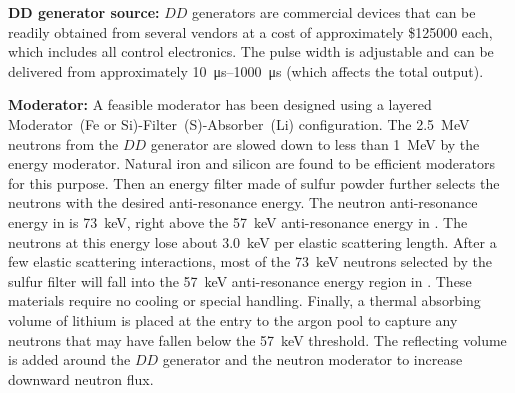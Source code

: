 {\bf DD generator source:} %
$DD$ generators are commercial devices that can be readily obtained from several vendors at a cost of approximately \$\num{125000} each, which includes all control electronics. The pulse width is adjustable and can be delivered from approximately \SIrange{10}{1000}{\micro\s} (which affects the total output). 

{\bf Moderator:}  A feasible moderator has been designed using a layered Moderator~(Fe or Si)-Filter~(S)-Absorber~(Li) %
configuration. The \SI{2.5}{\MeV} neutrons from the $DD$ generator are slowed down to less than \SI{1}{\MeV} by the energy moderator. Natural iron and silicon are found to be efficient moderators for this purpose. Then an energy filter made of sulfur powder further selects the neutrons with the desired anti-resonance energy.
The neutron anti-resonance energy in  is \SI{73}{\keV}, right above the \SI{57}{\keV} anti-resonance energy in . The neutrons at this energy lose about \SI{3.0}{\keV} per elastic scattering length. After a few elastic scattering interactions, most of the \SI{73}{\keV} neutrons selected by the sulfur filter will fall into the \SI{57}{\keV} anti-resonance energy region in . These materials require no cooling or special handling. Finally, a thermal absorbing volume of lithium is placed at the entry to the argon pool to capture any neutrons that may have fallen below the \SI{57}{\keV} threshold. The reflecting volume is added around the $DD$ generator and the neutron moderator to increase downward neutron flux. %


